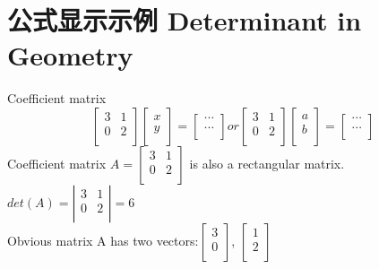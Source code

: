 \documentclass[10pt,aspectratio=43,mathserif,table]{beamer}
\begin{document}
\section{公式显示示例 Determinant in Geometry}
\begin{frame}{Coefficient matrix}
	$$	\left[\begin{array}{rr}
				3 & 1 \\
				0 & 2 \\
			\end{array}\right]
		\left[\begin{array}{r}
				x \\
				y \\
			\end{array}\right]
		=\left[\begin{array}{r}
				\cdots \\
				\cdots \\
			\end{array}\right]
		or
		\left[\begin{array}{rr}
				3 & 1 \\
				0 & 2 \\
			\end{array}\right]
		\left[\begin{array}{r}
				a \\
				b \\
			\end{array}\right]
		=\left[\begin{array}{r}
				\cdots \\
				\cdots \\
			\end{array}\right]
	$$
	Coefficient matrix
	$	A = 	\left[\begin{array}{rr}
				3 & 1 \\
				0 & 2 \\
			\end{array}\right]
	$
	is also a rectangular matrix.\\[0.2cm]
	$det(A) = \left|\begin{array}{rr}
			3 & 1 \\
			0 & 2 \\
		\end{array}\right| =6$\\[0.2cm]
	Obvious matrix A has two vectors:$		\left[\begin{array}{r}
				3 \\
				0 \\
			\end{array}\right]
	$,
	$		\left[\begin{array}{r}
				1 \\
				2 \\
			\end{array}\right]
	$
\end{frame}
\end{document}
